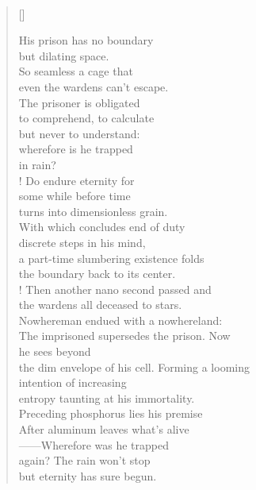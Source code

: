 \documentclass{book}
\begin{document}
\newpage
\poemtitle{\textcolor[RGB]{165,15,15}{The rainy redemption}}
\hspace*{\fill} \\
\settowidth{\versewidth}{the dim envelope of his cell. Forming a looming}
\begin{verse}[\versewidth]

    His prison has no boundary\\
    but dilating space.\\
    So seamless a cage that\\
    even the wardens can't escape.\\
    The prisoner is obligated\\
    to comprehend, to calculate\\
    but never to understand:\\
    wherefore is he trapped\\
    in rain?\\!
    Do endure eternity for\\
    some while before time\\
    turns into dimensionless grain.\\
    With which concludes end of duty\\
    discrete steps in his mind,\\
    a part-time slumbering existence folds\\
    the boundary back to its center.\\!
    Then another nano second passed and\\
    the wardens all deceased to stars.\\
    Nowhereman endued with a nowhereland:\\
    The imprisoned supersedes the prison. Now\\
    he sees beyond\\
    the dim envelope of his cell. Forming a looming\\
    intention of increasing\\
    entropy taunting at his immortality.\\
    Preceding phosphorus lies his premise\\
    After aluminum leaves what's alive\\
    ——Wherefore was he trapped\\
    again? The rain won't stop\\
    but eternity has sure begun.
\end{verse}
\end{document}
